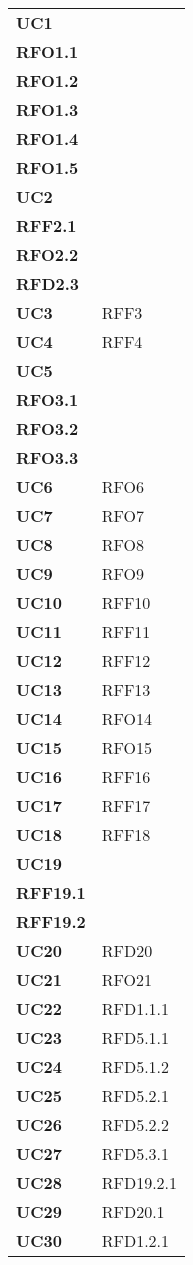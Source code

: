 \begin{longtable}[H]{>{\centering\bfseries}m{8cm}  >{\centering\arraybackslash}m{8cm}}
  \textbf{UC1} & {\begin{tabular}[c]{@{}c@{}}RFO1 \\ RFO1.1 \\ RFO1.2 \\ RFO1.3 \\ RFO1.4 \\ RFO1.5\end{tabular}}\\
  \textbf{UC2} & {\begin{tabular}[c]{@{}c@{}}RFF2 \\ RFF2.1 \\ RFO2.2 \\ RFD2.3\end{tabular}}\\
  \textbf{UC3} & RFF3 \\
  \textbf{UC4} & RFF4 \\
  \textbf{UC5} & {\begin{tabular}[c]{@{}c@{}}RFO3 \\ RFO3.1 \\ RFO3.2 \\ RFO3.3\end{tabular}}\\
  \textbf{UC6} & RFO6 \\
  \textbf{UC7} & RFO7 \\
  \textbf{UC8} & RFO8 \\
  \textbf{UC9} & RFO9 \\
  \textbf{UC10} & RFF10 \\
  \textbf{UC11} & RFF11 \\
  \textbf{UC12} & RFF12 \\
  \textbf{UC13} & RFF13 \\
  \textbf{UC14} & RFO14 \\
  \textbf{UC15} & RFO15 \\
  \textbf{UC16} & RFF16 \\
  \textbf{UC17} & RFF17 \\
  \textbf{UC18} & RFF18 \\
  \textbf{UC19} & {\begin{tabular}[c]{@{}c@{}}RFF19 \\ RFF19.1 \\ RFF19.2 \end{tabular}} \\
  \textbf{UC20} & RFD20 \\
  \textbf{UC21} & RFO21\\
  \textbf{UC22} & RFD1.1.1 \\
  \textbf{UC23} & RFD5.1.1 \\
  \textbf{UC24} & RFD5.1.2 \\
  \textbf{UC25} & RFD5.2.1 \\
  \textbf{UC26} & RFD5.2.2 \\
  \textbf{UC27} & RFD5.3.1 \\
  \textbf{UC28} & RFD19.2.1\\
  \textbf{UC29} & RFD20.1 \\
  \textbf{UC30} & RFD1.2.1 \\

\end{longtable}
